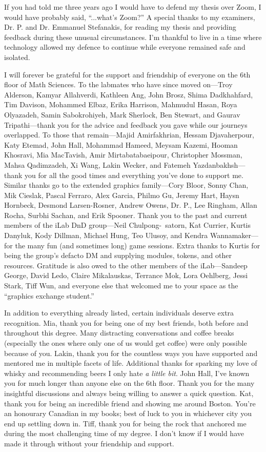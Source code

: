 If you had told me three years ago I would have to defend my thesis over Zoom, I would have probably said, ``...what's Zoom?''
A special thanks to my examiners, Dr. P. and Dr. Emmanuel Stefanakis, for reading my thesis and providing feedback during these unusual circumstances.
I'm thankful to live in a time where technology allowed my defence to continue while everyone remained safe and isolated.


I will forever be grateful for the support and friendship of everyone on the 6th floor of Math Sciences.
To the labmates who have since moved on---Troy Alderson, Kamyar Allahverdi, Kathleen Ang, John Brosz, Shima Dadkhahfard, Tim Davison, Mohammed Elbaz, Erika Harrison, Mahmudul Hasan, Roya Olyazadeh, Samin Sabokrohiyeh, Mark Sherlock, Ben Stewart, and Gaurav Tripathi---thank you for the advice and feedback you gave while our journeys overlapped.
To those that remain---Majid Amirfakhrian, Hessam Djavaherpour, Katy Etemad, John Hall, Mohammad Hameed, Meysam Kazemi, Hooman Khosravi, Mia MacTavish, Amir Mirtabatabaeipour, Christopher Mossman, Mahsa Qadimzadeh, Xi Wang, Lakin Wecker, and Fatemeh Yazdanbakhsh---thank you for all the good times and everything you've done to support me.
Similar thanks go to the extended graphics family---Cory Bloor, Sonny Chan, Mik Cieslak, Pascal Ferraro, Alex Garcia, Philmo Gu, Jeremy Hart, Haysn Hornbeck, Desmond Larsen-Rosner, Andrew Owens, Dr. P., Lee Ringham, Allan Rocha, Surbhi Sachan, and Erik Spooner.
Thank you to the past and current members of the iLab DnD group---Neil Chulpong-\ satorn, Kat Currier, Kurtis Danyluk, Kody Dillman, Michael Hung, Teo Ulusoy, and Kendra Wannamaker---for the many fun (and sometimes long) game sessions.
Extra thanks to Kurtis for being the group's defacto DM and supplying modules, tokens, and other resources.
Gratitude is also owed to the other members of the iLab---Sandeep George, David Ledo, Claire Mikalauskas, Terrance Mok, Lora Oehlberg, Jessi Stark, Tiff Wun, and everyone else that welcomed me to your space as the ``graphics exchange student.''


In addition to everything already listed, certain individuals deserve extra recognition.
Mia, thank you for being one of my best friends, both before and throughout this degree.
Many distracting conversations and coffee breaks (especially the ones where only one of us would get coffee) were only possible because of you.
Lakin, thank you for the countless ways you have supported and mentored me in multiple facets of life.
Additional thanks for sparking my love of whisky and recommending beers I only hate \textit{a little bit}.
John Hall, I've known you for much longer than anyone else on the 6th floor.
Thank you for the many insightful discussions and always being willing to answer a quick question.
Kat, thank you for being an incredible friend and showing me around Boston.
You're an honourary Canadian in my books; best of luck to you in whichever city you end up settling down in.
Tiff, thank you for being the rock that anchored me during the most challenging time of my degree.
I don't know if I would have made it through without your friendship and support.


